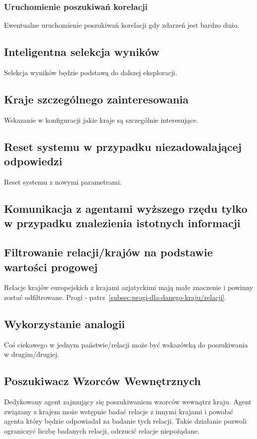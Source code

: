 \documentclass[11pt]{report}
\begin{document}
    \subsubsection{Uruchomienie poszukiwań korelacji}
    Ewentualne uruchomienie poszukiwań korelacji gdy zdarzeń jest bardzo dużo.

    \subsection{Inteligentna selekcja wyników}
    Selekcja wyników będzie podstawą do dalszej eksploracji.

    \subsection{Kraje szczególnego zainteresowania}
    Wskazanie w konfiguracji jakie kraje są szczególnie interesujące.

    \subsection{Reset systemu w przypadku niezadowalającej odpowiedzi}
    Reset systemu z nowymi parametrami.

    \subsection{Komunikacja z agentami wyższego rzędu tylko w przypadku znalezienia istotnych informacji}

    \subsection{Filtrowanie relacji/krajów na podstawie wartości progowej}
    Relacje krajów europejskich z krajami azjatyckimi mają małe znaczenie i powinny zostać odfiltrowane.
    Progi - patrz~\ref{subsec:progi-dla-danego-kraju/relacji}.

    \subsection{Wykorzystanie analogii}
    Coś ciekawego w jednym państwie/relacji może być wskazówką do poszukiwania w drugim/drugiej.

    \subsection{Poszukiwacz Wzorców Wewnętrznych}
    Dedykowany agent zajmujący się poszukiwaniem wzorców wewnątrz kraju.
    Agent związany z krajem może wstępnie badać relacje z innymi krajami
    i powołać agenta który będzie odpowiadał za badanie tych relacji.
    Takie działanie pozwoli ograniczyć liczbę badanych relacji, odrzucić relacje niepożądane.
\end{document}
